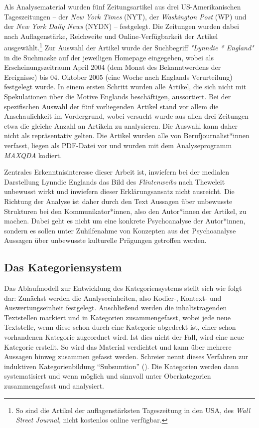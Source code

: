 \documentclass[12pt, titlepage=true, toc=bib]{scrartcl}
\begin{document}
Als Analysematerial wurden fünf Zeitungsartikel aus drei US-Amerikanischen Tageszeitungen -- der \textit{New York Times} (NYT), der \textit{Washington Post} (WP) und der \textit{New York Daily News} (NYDN) -- festgelegt. Die Zeitungen wurden dabei nach Auflagenstärke, Reichweite und Online-Verfügbarkeit der Artikel ausgewählt.\footnote{So sind die Artikel der auflagenstärksten Tageszeitung in den USA, des \textit{Wall Street Journal}, nicht kostenlos online verfügbar.} Zur Auswahl der Artikel wurde der Suchbegriff \textit{"Lynndie * England"} in die Suchmaske auf der jeweiligen Homepage eingegeben, wobei als Erscheinungszeitraum April 2004 (dem Monat des Bekanntwerdens der Ereignisse) bis 04. Oktober 2005 (eine Woche nach Englands Verurteilung) festgelegt wurde. In einem ersten Schritt wurden alle Artikel, die sich nicht mit Spekulationen über die Motive Englands beschäftigen, aussortiert. Bei der spezifischen Auswahl der fünf vorliegenden Artikel stand vor allem die Anschaulichkeit im Vordergrund, wobei versucht wurde aus allen drei Zeitungen etwa die gleiche Anzahl an Artikeln zu analysieren. Die Auswahl kann daher nicht als repräsentativ gelten. Die Artikel wurden alle von Berufjournalist*innen verfasst, liegen als PDF-Datei vor und wurden mit dem Analyseprogramm \textit{MAXQDA} kodiert.

Zentrales Erkenntnisinteresse dieser Arbeit ist, inwiefern bei der medialen Darstellung Lynndie Englands das Bild des \textit{Flintenweibs} nach Theweleit unbewusst wirkt und inwiefern dieser Erklärungsansatz nicht ausreicht. Die Richtung der Analyse ist daher durch den Text Aussagen über unbewusste Strukturen bei den Kommunikator*innen, also den Autor*innen der Artikel, zu machen. Dabei geht es nicht um eine konkrete Psychoanalyse der Autor*innen, sondern es sollen unter Zuhilfenahme von Konzepten aus der Psychoanalyse Aussagen über unbewusste kulturelle Prägungen getroffen werden.

\subsection{Das Kategoriensystem}

Das Ablaufmodell zur Entwicklung des Kategoriensystems stellt sich wie folgt dar: Zunächst werden die Analyseeinheiten, also Kodier-, Kontext- und Auswertungseinheit festgelegt. Anschließend werden die inhaltstragenden Textstellen markiert und in Kategorien zusammengefasst, wobei jede neue Textstelle, wenn diese schon durch eine Kategorie abgedeckt ist, einer schon vorhandenen Kategorie zugeordnet wird. Ist dies nicht der Fall, wird eine neue Kategorie erstellt. So wird das Material verdichtet und kann über mehrere Aussagen hinweg zusammen gefasst werden. Schreier nennt dieses Verfahren zur induktiven Kategorienbildung "`Subsumtion"' (\cite[7]{schreier_varianten_2014}). Die Kategorien werden dann systematisiert und wenn möglich und sinnvoll unter Oberkategorien zusammengefasst und analysiert.
\end{document}
